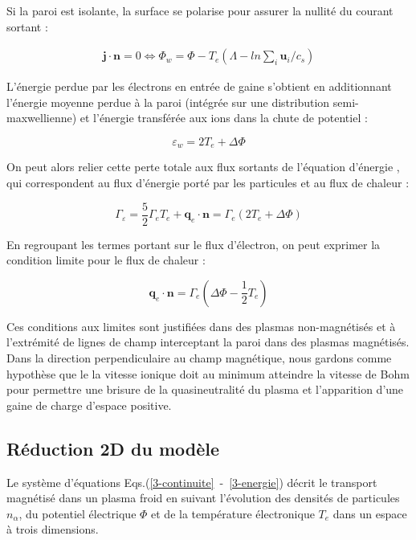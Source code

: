 \begin{refsection}
Si la paroi est isolante, la surface se polarise pour assurer la nullité du
courant sortant :

\begin{equation}\begin{split}
\mathbf j\cdot\mathbf{n}=0\Leftrightarrow
\Phi_w=\Phi-T_e(\Lambda-ln\sum_i\mathbf u_i/c_s)
\end{split}\end{equation}

L'énergie perdue par les électrons en entrée de gaine s'obtient en
additionnant l'énergie moyenne perdue à la paroi (intégrée sur une distribution
semi-maxwellienne) et l'énergie transférée aux ions dans la chute de potentiel :

\begin{equation}
	\varepsilon_w=2T_e+\Delta \Phi
\end{equation}
 
 On peut alors relier cette perte totale aux flux sortants de l'équation
 d'énergie , qui correspondent au flux d'énergie porté par
 les particules et au flux de chaleur :
 
\begin{equation}
\Gamma_\varepsilon=\frac{5}{2}{\Gamma}_eT_e+\mathbf{q}_e\cdot\mathbf{n}=
\Gamma_e\left(2T_e+\Delta \Phi\right)
\end{equation}

En regroupant les termes portant sur le flux d'électron, on peut exprimer la
condition limite pour le flux de chaleur :

\begin{equation}
\mathbf{q}_e\cdot\mathbf{n}=\Gamma_e\left(\Delta \Phi-\frac{1}{2}T_e\right)
\end{equation}

Ces conditions aux limites sont justifiées dans des plasmas non-magnétisés et à
l'extrémité de lignes de champ interceptant la paroi dans
des plasmas magnétisés. Dans la direction perpendiculaire au champ magnétique,
nous gardons comme hypothèse que le la vitesse ionique doit au
minimum atteindre la vitesse de Bohm pour permettre une brisure de
la quasineutralité du plasma et l'apparition d'une gaine de charge d'espace
positive.

\subsection{Réduction 2D du modèle}
Le système d'équations Eqs.(\ref{3-continuite}~-~\ref{3-energie}) décrit le
transport magnétisé dans un plasma froid en suivant l'évolution des densités de
particules $n_\alpha$, du potentiel électrique $\Phi$ et de la température
électronique $T_e$ dans un espace à trois dimensions. 


\end{refsection}
